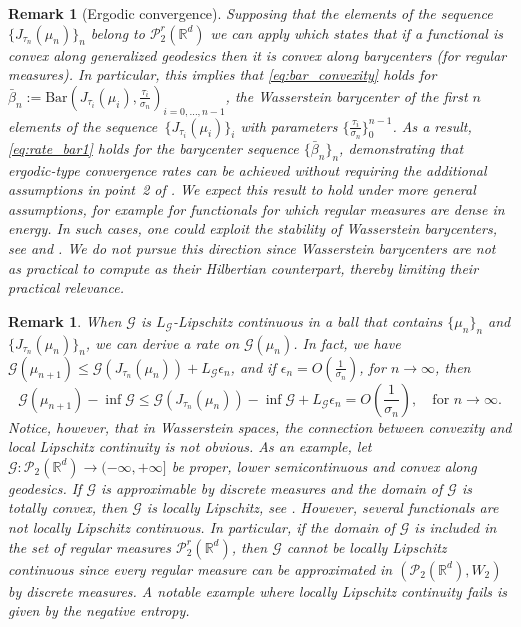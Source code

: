 \documentclass[11pt]{article}
\newtheorem{remark}[theorem]{Remark}
\newcommand{\cP}{\mathcal{P}}
\newcommand{\cG}{\mathcal{G}}
\newcommand{\R}{\mathbb{R}}
\newcommand{\RR}{(-\infty,+\infty]}
\numberwithin{equation}{section}
\begin{document}
\begin{remark}[Ergodic convergence]\label{rmk:ergodic}
		Supposing that the elements of the sequence $\{J_{\tau_n}(\mu_n)\}_n$ belong to $\cP_2^r(\R^d)$  we can apply \cite[Proposition 7.6]{Carlier11} which states that if a functional is convex along generalized geodesics then it is convex along barycenters (for regular measures). In particular, this implies that  \eqref{eq:bar_convexity} holds for $\bar \beta_n:= \text{Bar}\left(J_{\tau_i}(\mu_i), \frac{\tau_i}{\sigma_n}\right)_{i=0,\dots,n-1}$, the Wasserstein barycenter of the first $n$ elements of the sequence~$\{J_{\tau_i}(\mu_i)\}_i$ with parameters $\{\frac{\tau_i}{\sigma_n}\}_0^{n-1}$. As a result, \eqref{eq:rate_bar1} holds for the barycenter sequence $\{\bar \beta_n\}_n$, demonstrating that ergodic-type convergence rates can be achieved without requiring the additional assumptions in point~2 of . We expect this result to hold under more general assumptions, for example for functionals for which regular measures are dense in energy. In such cases, one could exploit the stability of Wasserstein barycenters, see \cite[Theorem 3]{LeGouic2017} and \cite{Carlier2024}. We do not pursue this direction since Wasserstein barycenters are not as practical to compute as their Hilbertian counterpart, thereby limiting their practical relevance.
	\end{remark}
	
	\begin{remark}
		When $\cG$ is $L_{\cG}$-Lipschitz continuous in a ball that contains $\{\mu_n\}_n$ and $\{J_{\tau_n}(\mu_n)\}_n$, we can derive a rate on $\cG(\mu_n)$. In fact, we have $\cG(\mu_{n+1})\leq \cG(J_{\tau_n}(\mu_n))+ L_{\cG} \epsilon_n$, and if $\epsilon_n = O\left(\frac{1}{\sigma_n}\right)$, for $n\to \infty$, then
		\[\cG(\mu_{n+1})-\inf \cG\leq \cG(J_{\tau_n}(\mu_n))-\inf \cG+ L_{\cG}\epsilon_n = O\left(\frac{1}{\sigma_n}\right), \quad \text{for } n\to \infty.\]
		Notice, however, that in Wasserstein spaces, the connection between convexity and local Lipschitz continuity is not obvious. As an example, let $\cG: \cP_2(\R^d) \to \RR$ be proper, lower semicontinuous and convex along geodesics. If $\cG$ is approximable by discrete measures and the domain of $\cG$ is totally convex, then $\cG$ is locally Lipschitz, see \cite[Remark 9]{CSS_2023}. However, several functionals are not locally Lipschitz continuous. In particular, if the domain of $\cG$ is included in the set of regular measures $\cP_2^r(\R^d)$, then $\cG$ cannot be locally Lipschitz continuous since every regular measure can be approximated in $(\cP_2(\R^d), W_2)$ by discrete measures. A notable example where locally Lipschitz continuity fails is given by the negative entropy.
\end{remark}
\end{document}
